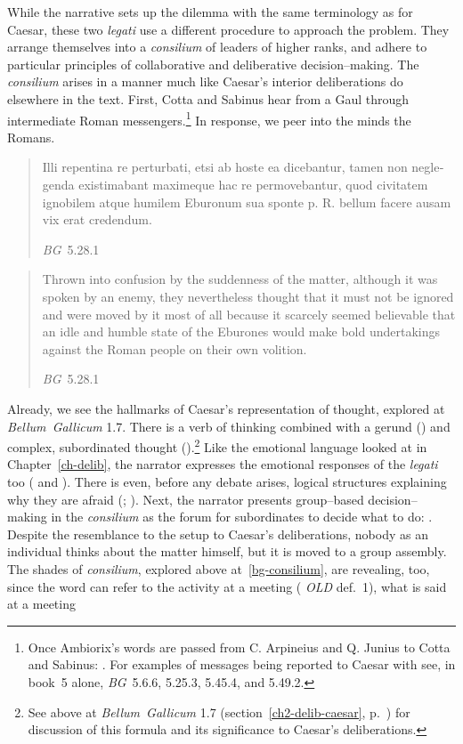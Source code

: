 \documentclass[12pt,letterpaper,oneside,final]{memoir}
\begin{document}
While the narrative sets up the dilemma with the same terminology as for Caesar, these two \emph{legati} use a different procedure to approach the problem. They arrange themselves into a \emph{consilium} of leaders of higher ranks, and adhere to particular principles of collaborative and deliberative decision--making. The \emph{consilium} arises in a manner much like Caesar's interior deliberations do elsewhere in the text. First, Cotta and Sabinus hear from a Gaul through intermediate Roman messengers.\footnote{Once Ambiorix's words are passed from C. Arpineius and Q. Junius to Cotta and Sabinus: . For examples of messages being reported to Caesar with  see, in book~5 alone, \emph{BG}~5.6.6, 5.25.3, 5.45.4, and 5.49.2.} In response, we peer into the minds the Romans. \blockquote[\emph{BG}~5.28.1]{\textlatin{Illi repentina re perturbati, etsi ab hoste ea dicebantur, tamen non neglegenda existimabant maximeque hac re permovebantur, quod civitatem ignobilem atque humilem Eburonum sua sponte p. R. bellum facere ausam vix erat credendum.}} \blockquote[\emph{BG}~5.28.1]{Thrown into confusion by the suddenness of the matter, although it was spoken by an enemy, they nevertheless thought that it must not be ignored and were moved by it most of all because it scarcely seemed believable that an idle and humble state of the Eburones would make bold undertakings against the Roman people on their own volition.} Already, we see the hallmarks of Caesar's representation of thought,  explored at \emph{Bellum~Gallicum} 1.7. There is a verb of thinking combined with a gerund () and complex, subordinated thought ().\footnote{See above at \emph{Bellum~Gallicum} 1.7 (section~\ref{ch2-delib-caesar}, p.~\pageref{ch2-delib-caesar}) for discussion of this formula and its significance to Caesar's deliberations.} Like the emotional language looked at in Chapter~\ref{ch-delib}, the narrator expresses the emotional responses of the \emph{legati} too ( and ). There is even, before any debate arises, logical structures explaining why they are afraid (; ). Next, the narrator presents group--based decision--making in the \emph{consilium} as the forum for subordinates to decide what to do: . Despite the resemblance to the setup to Caesar's deliberations, nobody as an individual thinks about the matter himself, but it is moved to a group assembly. The shades of \emph{consilium}, explored above at~\ref{bg-consilium}, are revealing, too, since the word can refer to the activity at a meeting (   \emph{OLD} def.~1), what is said at a meeting 
\end{document}
